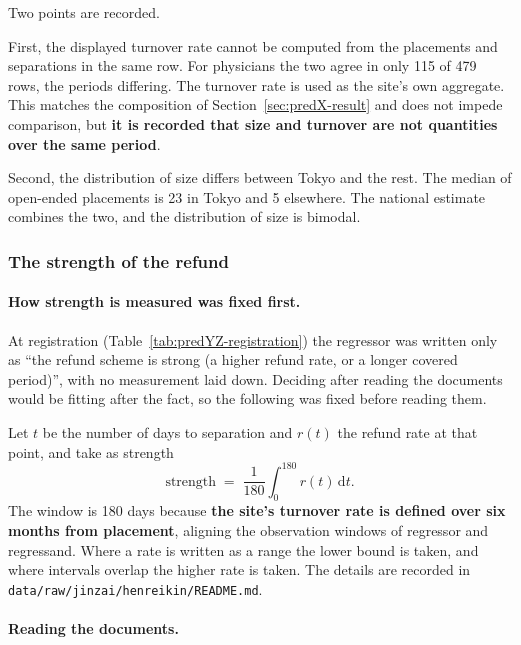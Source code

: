 \begin{remark}
\label{rem:predY-limits}
Two points are recorded.

First, the displayed turnover rate cannot be computed from the placements and separations in the
same row. For physicians the two agree in only 115 of 479 rows, the periods differing. The
turnover rate is used as the site's own aggregate. This matches the composition of
Section~\ref{sec:predX-result} and does not impede comparison, but \textbf{it is recorded that
size and turnover are not quantities over the same period}.

Second, the distribution of size differs between Tokyo and the rest. The median of open-ended
placements is 23 in Tokyo and 5 elsewhere. The national estimate combines the two, and the
distribution of size is bimodal.
\end{remark}


\subsubsection{The strength of the refund}
\label{sec:predZ-result}

\paragraph{How strength is measured was fixed first.}

At registration (Table~\ref{tab:predYZ-registration}) the regressor was written only as ``the
refund scheme is strong (a higher refund rate, or a longer covered period)'', with no measurement
laid down. Deciding after reading the documents would be fitting after the fact, so the following
was fixed before reading them.

Let $t$ be the number of days to separation and $r(t)$ the refund rate at that point, and take as
strength
\begin{equation}
\text{strength} \;=\; \frac{1}{180}\int_{0}^{180} r(t)\,\mathrm{d}t .
\label{eq:henreikin-strength}
\end{equation}
The window is 180 days because \textbf{the site's turnover rate is defined over six months from
placement}, aligning the observation windows of regressor and regressand. Where a rate is written
as a range the lower bound is taken, and where intervals overlap the higher rate is taken. The
details are recorded in \texttt{data/raw/jinzai/henreikin/README.md}.

\paragraph{Reading the documents.}

